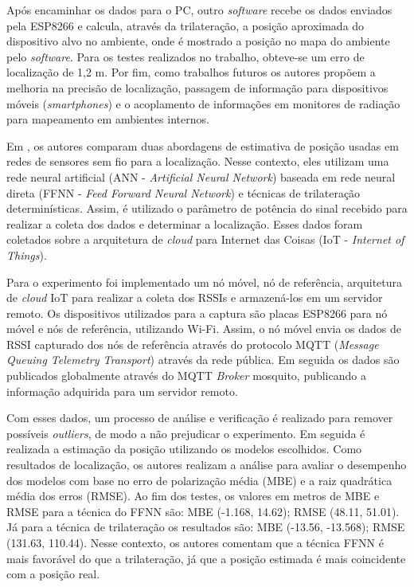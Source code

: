 \documentclass[12pt]{artigoifce}
\begin{document}
Após encaminhar os dados para o PC, outro \textit{software} recebe os dados enviados pela ESP8266 e calcula, através da trilateração, a posição aproximada do dispositivo alvo no ambiente, onde é mostrado a posição no mapa do ambiente pelo \textit{software}. Para os testes realizados no trabalho, obteve-se um erro de localização de 1,2 m. Por fim, como trabalhos futuros os autores propõem a melhoria na precisão de localização, passagem de informação para dispositivos móveis (\textit{smartphones}) e o acoplamento de informações em monitores de radiação para mapeamento em ambientes internos.

Em , os autores comparam duas abordagens de estimativa de posição usadas em redes de sensores sem fio para a localização. Nesse contexto, eles utilizam uma rede neural artificial (ANN - \textit{Artificial Neural Network}) baseada em rede neural direta (FFNN - \textit{Feed Forward Neural Network}) e técnicas de trilateração determinísticas. Assim, é utilizado o parâmetro de potência do sinal recebido para realizar a coleta dos dados e determinar a localização. Esses dados foram coletados sobre a arquitetura de \textit{cloud} para Internet das Coisas (IoT - \textit{Internet of Things}).

Para o experimento foi implementado um nó móvel, nó de referência, arquitetura de \textit{cloud} IoT para realizar a coleta dos RSSIs e armazená-los em um servidor remoto. Os dispositivos utilizados para a captura são placas ESP8266 para nó móvel e nós de referência, utilizando Wi-Fi. Assim, o nó móvel envia os dados de RSSI capturado dos nós de referência através do protocolo MQTT (\textit{Message Queuing Telemetry Transport}) através da rede pública. Em seguida os dados são publicados globalmente através do MQTT \textit{Broker} mosquito, publicando a informação adquirida para um servidor remoto.

Com esses dados, um processo de análise e verificação é realizado para remover possíveis \textit{outliers}, de modo a não prejudicar o experimento. Em seguida é realizada a estimação da posição utilizando os modelos escolhidos. Como resultados de localização, os autores realizam a análise para avaliar o desempenho dos modelos com base no erro de polarização média (MBE) e a raiz quadrática média dos erros (RMSE). Ao fim dos testes, os valores em metros de MBE e RMSE para a técnica do FFNN são: MBE (-1.168, 14.62); RMSE (48.11, 51.01). Já para a técnica de trilateração os resultados são: MBE (-13.56, -13.568); RMSE (131.63, 110.44). Nesse contexto, os autores comentam que a técnica FFNN é mais favorável do que a trilateração, já que a posição estimada é mais coincidente com a posição real. 
\end{document}
